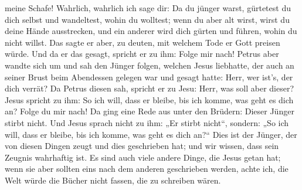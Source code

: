 meine Schafe!  Wahrlich, wahrlich ich sage dir: Da du
jünger warst, gürtetest du dich selbst und wandeltest, wohin du
wolltest; wenn du aber alt wirst, wirst du deine Hände ausstrecken, und
ein anderer wird dich gürten und führen, wohin du nicht willst.
 Das sagte er aber, zu deuten, mit welchem Tode er Gott
preisen würde. Und da er das gesagt, spricht er zu ihm: Folge mir nach!
 Petrus aber wandte sich um und sah den Jünger folgen,
welchen Jesus liebhatte, der auch an seiner Brust beim Abendessen
gelegen war und gesagt hatte: Herr, wer ist's, der dich verrät?
 Da Petrus diesen sah, spricht er zu Jesu: Herr, was soll
aber dieser?  Jesus spricht zu ihm: So ich will, dass er
bleibe, bis ich komme, was geht es dich an? Folge du mir nach!
 Da ging eine Rede aus unter den Brüdern: Dieser Jünger
stirbt nicht. Und Jesus sprach nicht zu ihm: „Er stirbt nicht``,
sondern: „So ich will, dass er bleibe, bis ich komme, was geht es dich
an?{}``  Dies ist der Jünger, der von diesen Dingen zeugt
und dies geschrieben hat; und wir wissen, dass sein Zeugnis wahrhaftig
ist.  Es sind auch viele andere Dinge, die Jesus getan hat;
wenn sie aber sollten eins nach dem anderen geschrieben werden, achte
ich, die Welt würde die Bücher nicht fassen, die zu schreiben wären.
